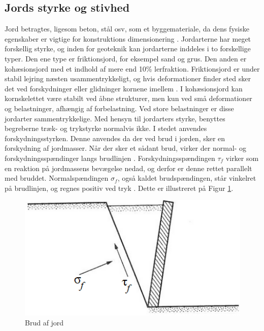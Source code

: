 \subsection{Jords styrke og stivhed}
Jord betragtes, ligesom beton, stål osv, som et byggemateriale, da dens fysiske egenskaber er vigtige for konstruktions dimensionering \citep{DGF}.
\newline \indent{     }  Jordarterne har meget forskellig styrke, og inden for geoteknik kan jordarterne inddeles i to forskellige typer. Den ene type er friktionsjord, for eksempel sand og grus. Den anden er kohæsionsjord med et indhold af mere end 10\% lerfraktion. 
Friktionsjord er under stabil lejring næsten usammentrykkeligt, og hvis deformationer finder sted sker det ved forskydninger eller glidninger kornene imellem \citep{DGF}.
\newline \indent{     }  I kohæsionsjord kan kornskelettet være stabilt ved åbne strukturer, men kun ved små deformationer og belastninger, afhængig af forbelastning. Ved store belastninger er disse jordarter sammentrykkelige.
\newline \indent{     }  Med hensyn til jordarters styrke, benyttes begreberne træk- og trykstyrke normalvis ikke. I stedet anvendes forskydningsstyrken. Denne anvendes da der ved brud i jorden, sker en forskydning af jordmasser. Når der sker et sådant brud, virker der normal- og forskydningsspændinger langs brudlinjen \citep{geoteknik}. Forskydningsspændingen $\tau_f$ virker som en reaktion på jordmassens bevægelse nedad, og derfor er denne rettet parallelt med bruddet. Normalspændingen $\sigma_f$, også kaldet brudspændingen, står vinkelret på brudlinjen, og regnes positiv ved tryk \citep{geoteknik}. Dette er illustreret på Figur \ref{fig:poretrykket}. 

\begin{figure}[htbp] \centering
	\begin{minipage}[b]{0.48\textwidth}\centering
		\includegraphics[width=1.0\textwidth]{billeder/poretrykket.png}
		\caption{Brud af jord \citep{Geoteknik}}
		\label{fig:poretrykket}
	\end{minipage}\hfill
\end{figure}

